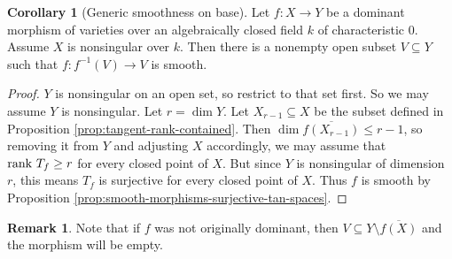 \documentclass[10pt,reqno]{amsart}
\theoremstyle{definition}
\newtheorem{corollary}[theorem]{Corollary}
\newtheorem{remark}[theorem]{Remark}
\theoremstyle{remark}
\numberwithin{equation}{section}
\numberwithin{theorem}{section}
\begin{document}
\begin{corollary}[Generic smoothness on base] Let $f: X \to Y$ be a dominant morphism of varieties over an algebraically closed field $k$ of characteristic $0$. Assume $X$ is nonsingular over $k$. Then there is a nonempty open subset $V \subseteq Y$ such that $f: f^{-1}(V) \to V$ is smooth.
\end{corollary}
\begin{proof}
$Y$ is nonsingular on an open set, so restrict to that set first. So we may assume $Y$ is nonsingular. Let $r = \dim Y$. Let $X_{r-1} \subseteq X$ be the subset defined in Proposition \ref{prop:tangent-rank-contained}. Then $\dim \overline{f(X_{r-1})} \le r-1$, so removing it from $Y$ and adjusting $X$ accordingly, we may assume that $\textup{rank }T_f \ge r$ for every closed point of $X$. But since $Y$ is nonsingular of dimension $r$, this means $T_f$ is surjective for every closed point of $X$. Thus $f$ is smooth by Proposition \ref{prop:smooth-morphisms-surjective-tan-spaces}.
\end{proof}

\begin{remark} Note that if $f$ was not originally dominant, then $V \subseteq Y \setminus \overline{f(X)}$ and the morphism will be empty.
\end{remark}
\end{document}
